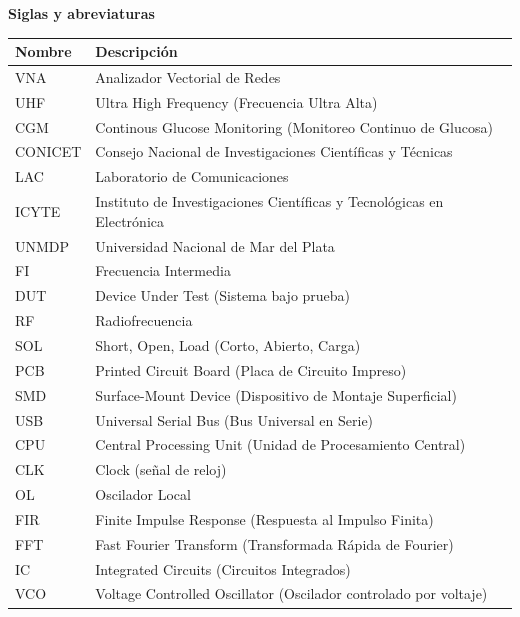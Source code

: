 \documentclass[11pt,a4paper, table, dvipsnames]{report}
\numberwithin{equation}{section}
\begin{document}
{\Huge\bfseries Siglas y abreviaturas\par}
\vspace{1.5cm}
\begin{center}
\begin{tabularx}{\textwidth}{|X|X|}
\arrayrulecolor{Thistle}
\hline
\rowcolor{Thistle!20}
\hline 
\textbf{Nombre}  & \textbf{Descripción}  \\
\hline
VNA & Analizador Vectorial de Redes\\
\hline
UHF & Ultra High Frequency (Frecuencia Ultra Alta)\\
\hline
CGM & Continous Glucose Monitoring (Monitoreo Continuo de Glucosa) \\
\hline
CONICET & Consejo Nacional de Investigaciones Científicas y Técnicas \\
\hline
LAC & Laboratorio de Comunicaciones\\
\hline
ICYTE & Instituto de Investigaciones Científicas y Tecnológicas en Electrónica \\
\hline
UNMDP & Universidad Nacional de Mar del Plata \\
\hline
FI & Frecuencia Intermedia\\
\hline
DUT & Device Under Test (Sistema bajo prueba)\\
\hline
RF & Radiofrecuencia \\
\hline
SOL & Short, Open, Load (Corto, Abierto, Carga) \\
\hline
PCB & Printed Circuit Board (Placa de Circuito Impreso) \\
\hline
SMD & Surface-Mount Device (Dispositivo de Montaje Superficial)\\
\hline
USB & Universal Serial Bus (Bus Universal en Serie)\\
\hline
CPU & Central Processing Unit (Unidad de Procesamiento Central) \\
\hline
CLK & Clock (señal de reloj) \\
\hline
OL & Oscilador Local \\
\hline
FIR & Finite Impulse Response (Respuesta al Impulso Finita)\\
\hline
FFT & Fast Fourier Transform (Transformada Rápida de Fourier)\\
\hline
IC & Integrated Circuits (Circuitos Integrados)\\
\hline
VCO & Voltage Controlled Oscillator (Oscilador controlado por voltaje)\\

\end{tabularx}
\end{center}
\end{document}
